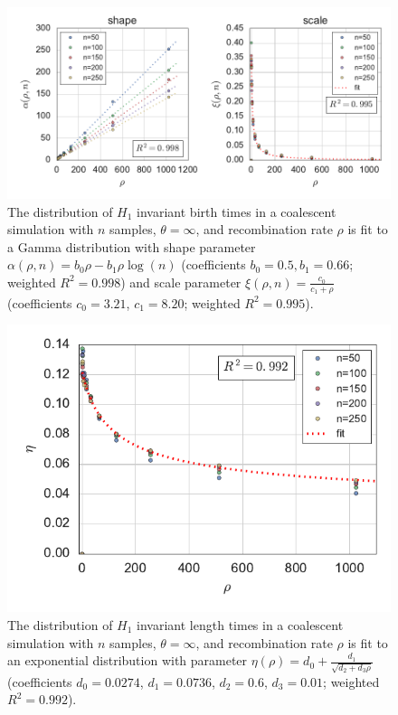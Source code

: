 \begin{figure}
\begin{center}
\centerline{\includegraphics[width=\columnwidth]{./fig/parametric_inference/coalescent_sims_fig3.pdf}}
\caption[Fitting the distribution of birth times to a Gamma]{The distribution of $H_1$ invariant birth times in a coalescent simulation with $n$ samples, $\theta=\infty$, and recombination rate $\rho$ is fit to a Gamma distribution with shape parameter $\alpha(\rho, n)=b_{0}\rho - b_{1}\rho\log(n)$ (coefficients $b_{0}=0.5, b_{1}=0.66$; weighted $R^2=0.998$) and scale parameter $\xi(\rho, n)=\frac{c_{0}}{c_{1}+\rho}$ (coefficients $c_{0}=3.21$, $c_{1}=8.20$; weighted $R^2=0.995$).}
\label{fig:coalescent_sims_fig3}
\end{center}
\end{figure}

\begin{figure}
\begin{center}
\centerline{\includegraphics[]{./fig/parametric_inference/coalescent_sims_fig4_v2.pdf}}
\caption[Fitting the length distribution to an exponential]{The distribution of $H_1$ invariant length times in a coalescent simulation with $n$ samples, $\theta=\infty$, and recombination rate $\rho$ is fit to an exponential distribution with parameter $\eta(\rho)=d_{0} + \frac{d_{1}}{\sqrt{d_{2}+d_{3}\rho}}$ (coefficients $d_{0}=0.0274$, $d_{1}=0.0736$, $d_{2}=0.6$, $d_{3}=0.01$; weighted $R^2=0.992$).}
\label{fig:coalescent_sims_fig4}
\end{center}
\end{figure}


